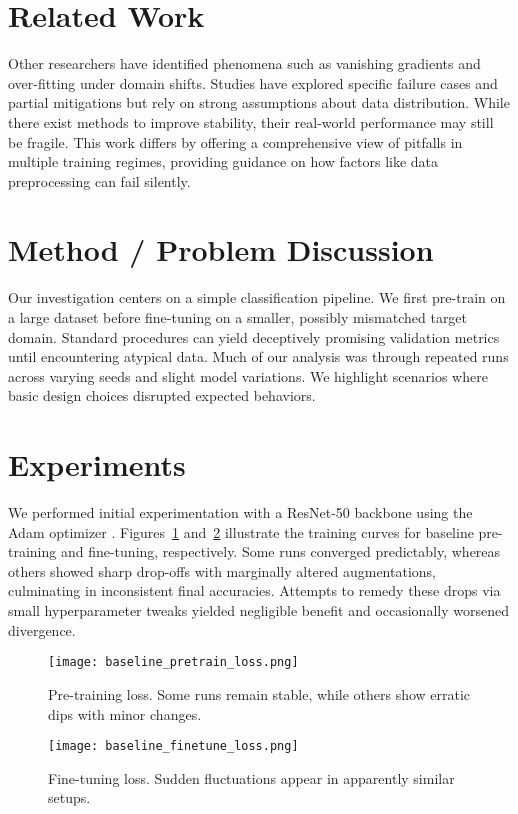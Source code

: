 \section{Related Work}
Other researchers have identified phenomena such as vanishing gradients and over-fitting under domain shifts. Studies have explored specific failure cases and partial mitigations but rely on strong assumptions about data distribution. While there exist methods to improve stability, their real-world performance may still be fragile. This work differs by offering a comprehensive view of pitfalls in multiple training regimes, providing guidance on how factors like data preprocessing can fail silently.

\section{Method / Problem Discussion}
Our investigation centers on a simple classification pipeline. We first pre-train on a large dataset before fine-tuning on a smaller, possibly mismatched target domain. Standard procedures can yield deceptively promising validation metrics until encountering atypical data. Much of our analysis was through repeated runs across varying seeds and slight model variations. We highlight scenarios where basic design choices disrupted expected behaviors.

\section{Experiments}
We performed initial experimentation with a ResNet-50 backbone \citep{he2016deep} using the Adam optimizer \citep{kingma2014adam}. Figures~\ref{fig:baseline_pretrain} and~\ref{fig:baseline_finetune} illustrate the training curves for baseline pre-training and fine-tuning, respectively. Some runs converged predictably, whereas others showed sharp drop-offs with marginally altered augmentations, culminating in inconsistent final accuracies. Attempts to remedy these drops via small hyperparameter tweaks yielded negligible benefit and occasionally worsened divergence.

\begin{figure}[t]
\centering
\texttt{[image: baseline\_pretrain\_loss.png]}
\caption{Pre-training loss. Some runs remain stable, while others show erratic dips with minor changes.}
\label{fig:baseline_pretrain}
\end{figure}

\begin{figure}[t]
\centering
\texttt{[image: baseline\_finetune\_loss.png]}
\caption{Fine-tuning loss. Sudden fluctuations appear in apparently similar setups.}
\label{fig:baseline_finetune}
\end{figure}

